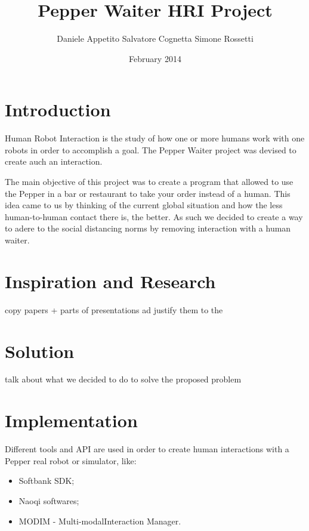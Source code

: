 \documentclass[12pt, letterpaper, twoside]{article}
\title{Pepper Waiter HRI Project}
\author{Daniele Appetito Salvatore Cognetta Simone Rossetti}
\date{February 2014}
\begin{document}
\begin{titlepage}
\maketitle
\end{titlepage}

\tableofcontents

\newpage
    

\section{Introduction}

Human Robot Interaction is the study of how one or more humans work with one robots in order to accomplish a goal. The Pepper Waiter project was devised to create auch an interaction. 

The main objective of this project was to create a program that allowed to use the Pepper in a bar or restaurant to take your order instead of a human. This idea came to us by thinking of the current global situation and how the less human-to-human contact there is, the better. As such we decided to create a way to adere to the social distancing norms by removing interaction with a human waiter. 

\section{Inspiration and Research}

copy papers + parts of presentations ad justify them to the 

\section{Solution}

talk about what we decided to do to solve the proposed problem

\section{Implementation}
Different tools and API are used in order to create human interactions with a Pepper real robot or simulator, like:

\begin{itemize}
	\item Softbank SDK;
	\item Naoqi softwares;
	\item MODIM - Multi-modalInteraction Manager.
\end{itemize}
\end{document}
